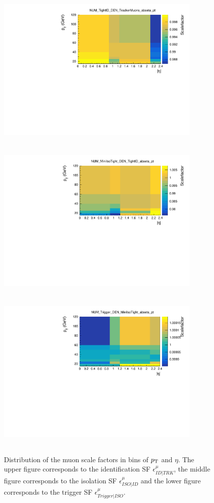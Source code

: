 \documentclass{cernatlasnote}
\newcommand{\pt}{$p_{\text T}$\xspace}
\begin{document}
\begin{appendices}
\begin{figure}
    \centering
    \includegraphics[height=8cm, width=10cm, trim= 0cm 0cm 0cm 0.cm,clip]{images/Muon/NUM_TightID_DEN_TrackerMuons.pdf}
    \includegraphics[height=8cm, width=10cm, trim= 0cm 0cm 0cm 0.cm,clip]{images/Muon/NUM_MiniIsoTight_DEN_TightID.pdf}
    \includegraphics[height=8cm, width=10cm, trim= 0cm 0cm 0cm 0.cm,clip]{images/Muon/NUM_Trigger_DEN_MiniIsoTight.pdf}
    \caption{ Distribution of the muon scale factors in bins of \pt and $\eta$. The upper figure corresponds to the identification SF $\epsilon^{\mu}_{ID|TRK}$, the middle figure corresponds to the isolation SF $\epsilon^{\mu}_{ISO|ID}$ and the lower figure corresponds to the trigger SF $\epsilon^{\mu}_{Trigger|ISO}$.}
    \label{fig:SP1}
\end{figure}


\end{appendices}
\end{document}
